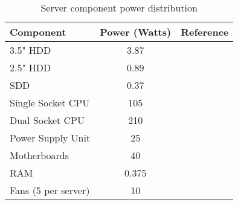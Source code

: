 \begin{table}[h]
\vspace{-10 pt}
\centering
\begin{tabular}{|l|c|c|} \hline

\bf{Component} & \bf{Power (Watts)} & \bf{Reference} \\ \hline 

3.5" HDD & 3.87 & \cite{fuchs219} \\ \hline
2.5" HDD & 0.89 & \cite{fuchs219} \\ \hline
SDD & 0.37 & \cite{fuchs219} \\ \hline
Single Socket CPU & 105 & \cite{kaggle17b} \\ \hline
Dual Socket CPU & 210 & \cite{kaggle17b} \\ \hline
Power Supply Unit & 25 & \cite{joshi12} \\ \hline
Motherboards & 40 & \cite{buildcomputers} \\ \hline
RAM & 0.375 & \cite{crucial} \\ \hline
Fans (5 per server) & 10 & \cite{buildcomputers} \\ \hline


\hline\end{tabular}
\caption{Server component power distribution}
\label{tab:it_component_power_dist_table}
\vspace{-10 pt}
\end{table}
